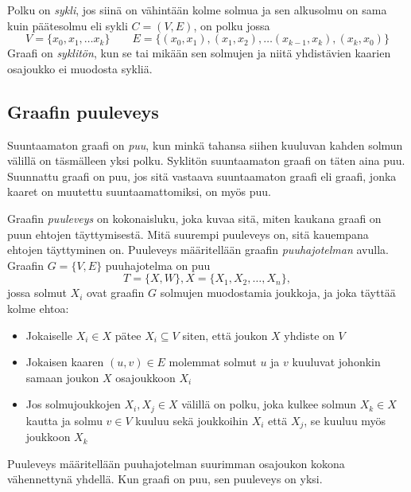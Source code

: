 \begin{center} 
\centering 
\begin{minipage}{.5\textwidth} 
  \centering 
\end{minipage}%
\begin{minipage}{.5\textwidth} 
  \centering 
\end{minipage} 
\end{center} 

Polku on \emph{sykli}, jos siinä on vähintään kolme solmua ja sen alkusolmu on sama kuin päätesolmu eli sykli $C = (V, E)$, on polku jossa 
$$ 
    V = \{x_0, x_1, \ldots x_k \} \qquad E = \{(x_0, x_1), (x_1,x_2),\ldots(x_{k-1}, x_k), (x_k, x_0)\} 
$$ 
Graafi on \emph{syklitön}, kun se tai mikään sen solmujen ja niitä yhdistävien kaarien osajoukko ei muodosta sykliä. 

\subsection{Graafin puuleveys}\label{puuleveys} 

Suuntaamaton graafi on \emph{puu}, kun minkä tahansa siihen kuuluvan kahden solmun välillä on täsmälleen yksi polku. Syklitön suuntaamaton graafi on täten aina puu. Suunnattu graafi on puu, jos sitä vastaava suuntaamaton graafi eli graafi, jonka kaaret on muutettu suuntaamattomiksi, on myös puu. 

Graafin \emph{puuleveys} \citep{robertson_graph_1984} on kokonaisluku, joka kuvaa sitä, miten kaukana graafi on puun ehtojen täyttymisestä. Mitä suurempi puuleveys on, sitä kauempana ehtojen täyttyminen on. Puuleveys määritellään graafin \emph{puuhajotelman} avulla. Graafin $G = \{ V,E \}$ puuhajotelma on puu  
$$     
    T = \{X, W\}, X = \{X_1, X_2, \ldots , X_n\}, 
$$ 
jossa solmut $X_i$ ovat graafin $G$ solmujen muodostamia joukkoja, ja joka täyttää kolme ehtoa: 
\begin{itemize} 

    \item Jokaiselle $X_i \in X$ pätee $X_i \subseteq V$ siten, että joukon $X$ yhdiste on $V$ \\   

    \item Jokaisen kaaren $( u, v ) \in E$ molemmat solmut $u$ ja $v$ kuuluvat johonkin samaan joukon $X$ osajoukkoon $X_i$ \\ 

    \item Jos solmujoukkojen $X_i, X_j \in X$ välillä on polku, joka kulkee solmun $X_k \in X$ kautta ja solmu $v \in V$ kuuluu sekä joukkoihin $X_i$ että $X_j$, se kuuluu myös joukkoon $X_k$ 

\end{itemize} 
Puuleveys määritellään puuhajotelman suurimman osajoukon kokona vähennettynä yhdellä. Kun graafi on puu, sen puuleveys on yksi. 

